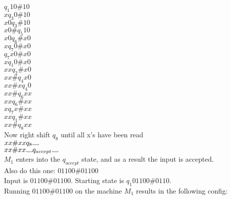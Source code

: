 \documentclass[12pt]{article}
\newcommand\Vtextvisiblespace[1][.8em]{%
	\mbox{\kern.07em\vrule height.3ex}%
	\vbox{\hrule width#1}%
	\hbox{\vrule height.3ex}}
\begin{document}
$            q_1 10 \# 10   $ \\
$x           q_3 0  \# 10   $ \\
$x0          q_3    \# 10   $ \\
$x0 \#       q_5       10   $ \\
$x0          q_6    \# x0   $ \\
$x           q_7  0 \# x0   $ \\
$            q_7 x0 \# x0   $ \\
$x           q_1  0 \# x0   $ \\
$xx          q_2    \# x0   $ \\
$xx \#       q_4       x0   $ \\
$xx \# x     q_4        0   $ \\
$xx \#       q_6       xx   $ \\
$xx          q_6    \# xx   $ \\
$x           q_7  x \# xx   $ \\
$xx          q_1    \# xx   $ \\
$xx \#       q_8       xx   $ \\
Now right shift $q_8$ until all x's have been read \\
$xx \# xx    q_8  \Vtextvisiblespace   $ \\
$xx \# xx         \Vtextvisiblespace q_{accept} \Vtextvisiblespace $ \\
$M_1$ enters into the $q_{accept}$ state, and as a result the input is accepted. \\

\pagebreak
Also do this one: $01100\#01100$ \\

Input is $01100\#01100$. Starting state is $q_1 01100\#0110$. \\
Running $01100\#01100$ on the machine $M_1$ results in the following config: \\
\end{document}
